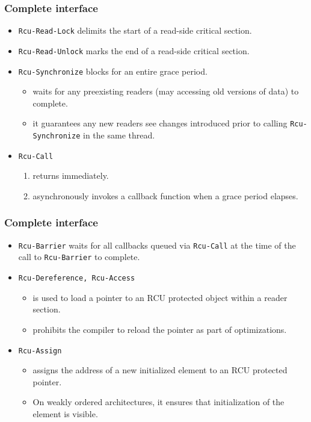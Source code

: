 \documentclass{beamer}
\begin{document}
\begin{frame}[t]
  \frametitle{Complete interface}

  \begin{itemize}
  \item \texttt{Rcu-Read-Lock} delimits the start of a read-side critical section.
  \item \texttt{Rcu-Read-Unlock} marks the end of a read-side critical section.
  \item \texttt{Rcu-Synchronize} blocks for an entire grace period.
    \begin{itemize}
    \item waits for any preexisting readers (may accessing old versions of data) to
      complete. 
    \item it guarantees any new readers see changes introduced prior to calling
      \texttt{Rcu-Synchronize} in the same thread.
    \end{itemize}
  \item \texttt{Rcu-Call}
    \begin{enumerate}
    \item returns immediately.
    \item asynchronously invokes a callback function when a grace period elapses.
    \end{enumerate}
  \end{itemize}

\end{frame}


\begin{frame}[t]
  \frametitle{Complete interface}

  \begin{itemize}
  \item \texttt{Rcu-Barrier} waits for all callbacks queued via \texttt{Rcu-Call} at the
    time of the
    call to \texttt{Rcu-Barrier} to complete.
  \item \texttt{Rcu-Dereference, Rcu-Access} 
    \begin{itemize}
    \item is used to load a pointer to an RCU protected object within a reader section.
    \item prohibits the compiler to reload the pointer as part of optimizations.
    \end{itemize}
  \item \texttt{Rcu-Assign} 
    \begin{itemize}
    \item assigns the address of a new initialized element to an RCU protected pointer.
    \item On weakly ordered architectures, it ensures that initialization of the element
      is visible.
    \end{itemize}
  \end{itemize}
  
\end{frame}
\end{document}
